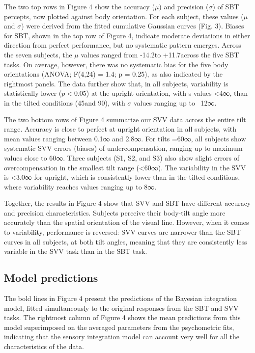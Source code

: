 The two top rows in Figure 4 show the accuracy ($\mu$) and precision ($\sigma$) of SBT percepts, now plotted against body orientation. For each subject, these values ($\mu$ and $\sigma$) were derived from the fitted cumulative Gaussian curves (Fig. 3). Biases for SBT, shown in the top row of Figure 4, indicate moderate deviations in either direction from perfect performance, but no systematic pattern emerges. Across the seven subjects, the $\mu$ values ranged from -14.2\textdegree to +11.7\textdegree across the five SBT tasks. On average, however, there was no systematic bias for the five body orientations (ANOVA; F(4,24) = 1.4; p = 0.25), as also indicated by the rightmost panels. The data further show that, in all subjects, variability is statistically lower ($p < 0.05$) at the upright orientation, with s values <4∞, than in the tilted conditions (45\textdegree and 90\textdegree), with $\sigma$ values ranging up to ~12∞. 

The two bottom rows of Figure 4 summarize our SVV data across the entire tilt range. Accuracy is close to perfect at upright orientation in all subjects, with mean values ranging between 0.1∞ and 2.8∞. For tilts =60∞, all subjects show systematic SVV errors (biases) of undercompensation, ranging up to maximum values close to 60∞. Three subjects (S1, S2, and S3) also show slight errors of overcompensation in the smallest tilt range (<60∞). The variability in the SVV is <3.0∞ for upright, which is consistently lower than in the tilted conditions, where variability reaches values ranging up to 8∞. 

Together, the results in Figure 4 show that SVV and SBT have different accuracy and precision characteristics. Subjects perceive their body-tilt angle more accurately than the spatial orientation of the visual line. However, when it comes to variability, performance is reversed: SVV curves are narrower than the SBT curves in all subjects, at both tilt angles, meaning that they are consistently less variable in the SVV task than in the SBT task. 

\subsection{Model predictions}

The bold lines in Figure 4 present the predictions of the Bayesian integration model, fitted simultaneously to the original responses from the SBT and SVV tasks. The rightmost column of Figure 4 shows the mean predictions from this model superimposed on the averaged parameters from the psychometric fits, indicating that the sensory integration model can account very well for all the characteristics of the data. 


